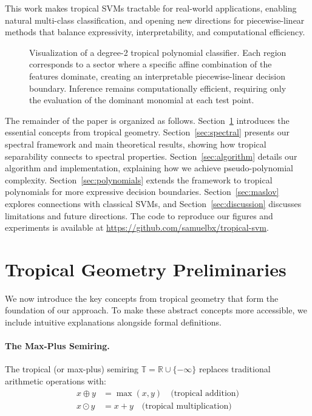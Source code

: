 \documentclass{article}
\newcommand{\R}{\mathbb{R}}
\newcommand{\trop}{\mathbb{T}}
\begin{document}
This work makes tropical SVMs tractable for real-world applications, enabling natural multi-class classification, and opening new directions for piecewise-linear methods that balance expressivity, interpretability, and computational efficiency.

\begin{figure}[h]
    \centering
    \resizebox{0.99\textwidth}{!}{\clipbox{0.15\width{} 0.30\height{} 0.15\width{} 0.30\height{}}{}}
    \caption{Visualization of a degree-2 tropical polynomial classifier. Each region corresponds to a sector where a specific affine combination of the features dominate, creating an interpretable piecewise-linear decision boundary. Inference remains computationally efficient, requiring only the evaluation of the dominant monomial at each test point.}
    \label{fig:tropical_hyperplane}
\end{figure}

The remainder of the paper is organized as follows. Section~\ref{sec:prelim} introduces the essential concepts from tropical geometry. Section~\ref{sec:spectral} presents our spectral framework and main theoretical results, showing how tropical separability connects to spectral properties. Section~\ref{sec:algorithm} details our algorithm and implementation, explaining how we achieve pseudo-polynomial complexity. Section~\ref{sec:polynomials} extends the framework to tropical polynomials for more expressive decision boundaries. Section~\ref{sec:maslov} explores connections with classical SVMs, and Section~\ref{sec:discussion} discusses limitations and future directions. The code to reproduce our figures and experiments is available at \url{https://github.com/samuelbx/tropical-svm}.

\section{Tropical Geometry Preliminaries}\label{sec:prelim}

We now introduce the key concepts from tropical geometry that form the foundation of our approach. To make these abstract concepts more accessible, we include intuitive explanations alongside formal definitions.

\paragraph{The Max-Plus Semiring.}
The tropical (or max-plus) semiring $\trop = \R \cup \{-\infty\}$ replaces traditional arithmetic operations with:
\begin{align}
x \oplus y &= \max(x,y) \quad \text{(tropical addition)} \\
x \odot y &= x + y \quad \text{(tropical multiplication)}
\end{align}
\end{document}
